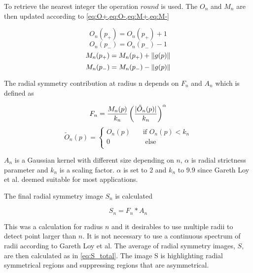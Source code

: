 To retrieve the nearest integer the operation $round$ is used. The $O_n$ and $M_n$ are then updated according to \cref{eq:O+,eq:O-,eq:M+,eq:M-}

\begin{equation} \label{eq:O+}
O_{n}(p_{+}) = O_{n}(p_{+}) + 1
\end{equation}
\begin{equation} \label{eq:O-}
O_{n}(p_{-}) = O_{n}(p_{-}) - 1
\end{equation}
\begin{equation} \label{eq:M+}
M_{n}(p_{+}) = M_{n}(p_{+}) + \lVert g(p)\rVert
\end{equation}
\begin{equation} \label{eq:M-}
M_{n}(p_{-}) = M_{n}(p_{-}) - \lVert g(p)\rVert
\end{equation}

The radial symmetry contribution at radius n depends on $F_n$ and $A_n$ which is defined as 

\begin{equation} \label{eq:F}
F_n = \frac{M_{n}(p)}{k_n} \left(\frac{\lvert\tilde{O}_n(p)\rvert}{k_n}\right)^{\alpha}
\end{equation}
\begin{equation} \label{eq:A}
\tilde{O}_n(p) =   
\begin{cases}
O_n(p)    & \quad \text{if } O_n(p) < k_n\\
0		& \quad  \text{ else}\\
\end{cases}
\end{equation}

$A_n$ is a Gaussian kernel with different size depending on $n$, $\alpha$ is radial strictness parameter and $k_n$ is a scaling factor. $\alpha$ is set to $2$ and $k_n$ to $9.9$ since Gareth Loy et al. deemed suitable for most applications.

The final radial symmetry image $S_n$ is calculated 

\begin{equation} \label{eq:S_for_n}
S_{n} = F_n * A_n
\end{equation}

This was a calculation for radius $n$ and it desirables to use multiple radii to detect point larger than $n$. It is not necessary to use a continuous spectrum of radii according to Gareth Loy et al. The average of radial symmetry images, $S$, are then calculated as in \cref{eq:S_total}. The image S is highlighting radial symmetrical regions and suppressing regions that are asymmetrical.  

